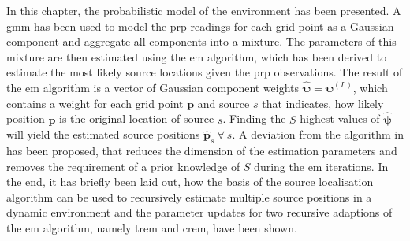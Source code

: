 \bigskip

In this chapter, the probabilistic model of the environment has been presented. A \gls{gmm} has been used to model the \gls{prp} readings for each grid point as a Gaussian component and aggregate all components into a mixture. The parameters of this mixture are then estimated using the \gls{em} algorithm, which has been derived to estimate the most likely source locations given the \gls{prp} observations. The result of the \gls{em} algorithm is a vector of Gaussian component weights $\hat{\bm\psi}=\bm\psi^{(L)}$, which contains a weight for each grid point $\bm p$ and source $s$ that indicates, how likely position $\bm p$ is the original location of source $s$. Finding the $S$ highest values of $\hat{\bm\psi}$ will yield the estimated source positions $\hat{\bm p}_s\ \forall\ s$. A deviation from the algorithm in \cite{Schwartz2014} has been proposed, that reduces the dimension of the estimation parameters and removes the requirement of a prior knowledge of $S$ during the \gls{em} iterations. In the end, it has briefly been laid out, how the basis of the source localisation algorithm can be used to recursively estimate multiple source positions in a dynamic environment and the parameter updates for two recursive adaptions of the \gls{em} algorithm, namely \gls{trem} and \gls{crem}, have been shown.